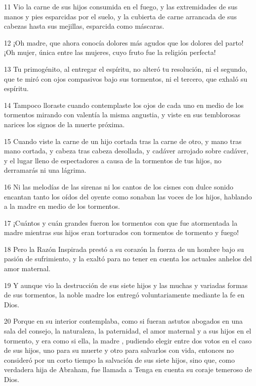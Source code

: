 \par 11 Vio la carne de sus hijos consumida en el fuego, y las extremidades de sus manos y pies esparcidas por el suelo, y la cubierta de carne arrancada de sus cabezas hasta sus mejillas, esparcida como máscaras.

\par 12 ¡Oh madre, que ahora conocía dolores más agudos que los dolores del parto! ¡Oh mujer, única entre las mujeres, cuyo fruto fue la religión perfecta!

\par 13 Tu primogénito, al entregar el espíritu, no alteró tu resolución, ni el segundo, que te miró con ojos compasivos bajo sus tormentos, ni el tercero, que exhaló su espíritu.

\par 14 Tampoco lloraste cuando contemplaste los ojos de cada uno en medio de los tormentos mirando con valentía la misma angustia, y viste en sus temblorosas narices los signos de la muerte próxima.

\par 15 Cuando viste la carne de un hijo cortada tras la carne de otro, y mano tras mano cortada, y cabeza tras cabeza desollada, y cadáver arrojado sobre cadáver, y el lugar lleno de espectadores a causa de la tormentos de tus hijos, no derramarás ni una lágrima.

\par 16 Ni las melodías de las sirenas ni los cantos de los cisnes con dulce sonido encantan tanto los oídos del oyente como sonaban las voces de los hijos, hablando a la madre en medio de los tormentos.

\par 17 ¡Cuántos y cuán grandes fueron los tormentos con que fue atormentada la madre mientras sus hijos eran torturados con tormentos de tormento y fuego!

\par 18 Pero la Razón Inspirada prestó a su corazón la fuerza de un hombre bajo su pasión de sufrimiento, y la exaltó para no tener en cuenta los actuales anhelos del amor maternal.

\par 19 Y aunque vio la destrucción de sus siete hijos y las muchas y variadas formas de sus tormentos, la noble madre los entregó voluntariamente mediante la fe en Dios.

\par 20 Porque en su interior contemplaba, como si fueran astutos abogados en una sala del consejo, la naturaleza, la paternidad, el amor maternal y a sus hijos en el tormento, y era como si ella, la madre , pudiendo elegir entre dos votos en el caso de sus hijos, uno para su muerte y otro para salvarlos con vida, entonces no consideró por un corto tiempo la salvación de sus siete hijos, sino que, como verdadera hija de Abraham, fue llamada a Tenga en cuenta su coraje temeroso de Dios.

